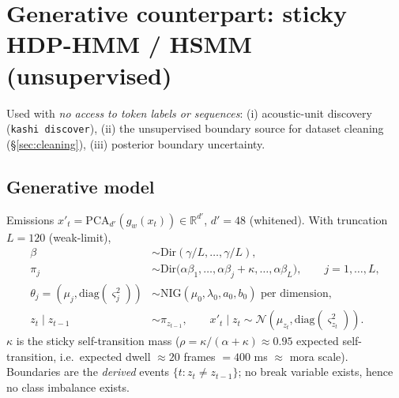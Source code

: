 \documentclass[10pt]{article}
\newcommand{\R}{\mathbb{R}}
\newcommand{\Dir}{\mathrm{Dir}}
\newcommand{\Norm}{\mathcal{N}}
\begin{document}
\section{Generative counterpart: sticky HDP-HMM / HSMM (unsupervised)}\label{sec:hdphmm}

Used with \emph{no access to token labels or sequences}: (i) acoustic-unit discovery (\texttt{kashi discover}), (ii) the unsupervised boundary source for dataset cleaning (\S\ref{sec:cleaning}), (iii) posterior boundary uncertainty.

\subsection{Generative model}
Emissions $x'_t = \mathrm{PCA}_{d'}(g_w(x_t)) \in \R^{d'}$, $d' = 48$ (whitened). With truncation $L = 120$ (weak-limit),
\begin{align}
\beta &\sim \Dir(\gamma/L, \dots, \gamma/L), \\
\pi_j &\sim \Dir\big(\alpha\beta_1, \dots, \alpha\beta_j + \kappa, \dots, \alpha\beta_L\big), \qquad j = 1,\dots,L,\\
\theta_j = (\mu_j, \mathrm{diag}(\varsigma_j^2)) &\sim \mathrm{NIG}(\mu_0, \lambda_0, a_0, b_0) \text{ per dimension}, \\
z_t \mid z_{t-1} &\sim \pi_{z_{t-1}}, \qquad x'_t \mid z_t \sim \Norm(\mu_{z_t}, \mathrm{diag}(\varsigma^2_{z_t})).
\end{align}
$\kappa$ is the sticky self-transition mass ($\rho = \kappa/(\alpha+\kappa) \approx 0.95$ expected self-transition, i.e.\ expected dwell $\approx 20$ frames $= 400$ ms $\approx$ mora scale). Boundaries are the \emph{derived} events $\{t : z_t \ne z_{t-1}\}$; no break variable exists, hence no class imbalance exists.
\end{document}
